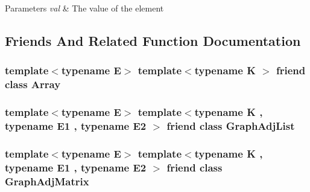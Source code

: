 \begin{DoxyParams}{Parameters}
{\em val} & The value of the element \\
\hline
\end{DoxyParams}


\subsection{Friends And Related Function Documentation}
\hypertarget{classbridges_1_1_element_ab1a595168ea1870ce436dfd2d8e69b6d}{}
\subsubsection[{Array}]{\setlength{\rightskip}{0pt plus 5cm}template$<$typename E$>$ template$<$typename K $>$ friend class {\bf Array}\hspace{0.3cm}{\ttfamily [friend]}}\label{classbridges_1_1_element_ab1a595168ea1870ce436dfd2d8e69b6d}
\hypertarget{classbridges_1_1_element_a65850138f0763fec43a76fb942f0eccc}{}
\subsubsection[{Graph\+Adj\+List}]{\setlength{\rightskip}{0pt plus 5cm}template$<$typename E$>$ template$<$typename K , typename E1 , typename E2 $>$ friend class {\bf Graph\+Adj\+List}\hspace{0.3cm}{\ttfamily [friend]}}\label{classbridges_1_1_element_a65850138f0763fec43a76fb942f0eccc}
\hypertarget{classbridges_1_1_element_a1935808473b7eb8ff54149c5436c3ac9}{}
\subsubsection[{Graph\+Adj\+Matrix}]{\setlength{\rightskip}{0pt plus 5cm}template$<$typename E$>$ template$<$typename K , typename E1 , typename E2 $>$ friend class {\bf Graph\+Adj\+Matrix}\hspace{0.3cm}{\ttfamily [friend]}}\label{classbridges_1_1_element_a1935808473b7eb8ff54149c5436c3ac9}


